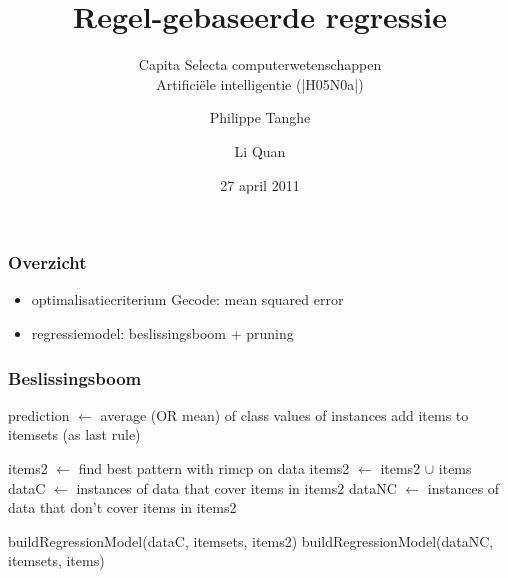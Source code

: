 \documentclass{beamer}
\author{\hspace{-1 cm}Philippe Tanghe\hspace{1 cm}\and Li Quan}
\title{Regel-gebaseerde regressie}
\date{27 april 2011}
\subtitle{Capita Selecta computerwetenschappen\\ Artificiële intelligentie (|H05N0a|)}
\begin{document}
\begin{frame}
\titlepage
\end{frame}



\begin{frame}
\frametitle{Overzicht}
\begin{itemize}
 \item optimalisatiecriterium Gecode: mean squared error
 \item regressiemodel: beslissingsboom + pruning
\end{itemize}

% 

\end{frame}


\begin{frame}
\frametitle{Beslissingsboom}
\begin{algorithm}[H]
\caption{buildRegressionModel(data, itemsets, items)}

\label{buildRegressionModel}

{
    prediction $\leftarrow$ average (OR mean) of class values of instances\;
    add items to itemsets (as last rule)\;    
}
{
items2 $\leftarrow$ find best pattern with rimcp on data\;
items2 $\leftarrow$ items2 $\cup$ items\;
dataC $\leftarrow$ instances of data that cover items in items2\; 
dataNC $\leftarrow$ instances of data that don't cover items in items2\; 

buildRegressionModel(dataC, itemsets, items2)\;
buildRegressionModel(dataNC, itemsets, items)\;
}
\end{algorithm}

\end{frame}
\end{document}
